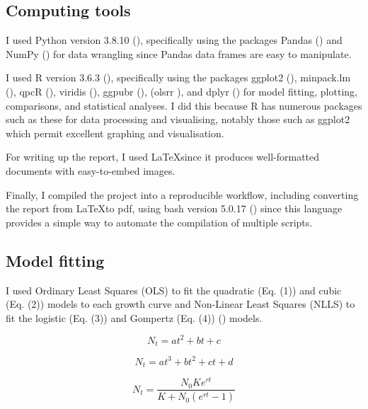 \documentclass[11pt]{article}
\begin{document}
	\subsection{Computing tools}
	
	I used Python version 3.8.10 (\cite{10.5555/1593511}), specifically using the packages Pandas (\cite{mckinney2010data}) and NumPy (\cite{harris2020array}) for data wrangling since Pandas data frames are easy to manipulate.
	
	I used R version 3.6.3 (\cite{R_citation}), specifically using the packages ggplot2 (\cite{ggplot2_citation}), minpack.lm (\cite{elzhov2010r}), qpcR (\cite{Ahmed2018-ni}), viridis (\cite{viridis_citation}), ggpubr (\cite{kassambara2020package}), (olsrr \cite{hebbali2017package}), and dplyr (\cite{wickham2015dplyr}) for model fitting, plotting, comparisons, and statistical analyses. I did this because R has numerous packages such as these for data processing and visualising, notably those such as ggplot2 which permit excellent graphing and visualisation. 
	
	For writing up the report, I used \LaTeX since it produces well-formatted documents with easy-to-embed images.
	
	Finally, I compiled the project into a reproducible workflow, including converting the report from \LaTeX to pdf, using bash version 5.0.17 (\cite{gnu2007free}) since this language provides a simple way to automate the compilation of multiple scripts.
	
	
	\subsection{Model fitting}
	
	I used Ordinary Least Squares (OLS) to fit the quadratic (Eq. (1)) and cubic (Eq. (2)) models to each growth curve and Non-Linear Least Squares (NLLS) to fit the logistic (Eq. (3)) and Gompertz (Eq. (4)) (\cite{gompertz1825xxiv}) models.
	
	\begin{equation}
		N_t = at^2 + bt + c
	\end{equation}
	
	\begin{equation}
		N_t = at^3 + bt^2 + ct + d
	\end{equation}
	
	\begin{equation}
		N_t = \frac{N_0Ke^{rt}}{K + N_0(e^{rt} - 1)}
	\end{equation}
	
\end{document}
